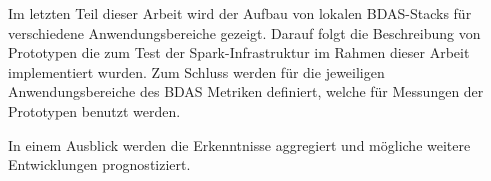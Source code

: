 Im letzten Teil dieser Arbeit wird der Aufbau von lokalen BDAS-Stacks für verschiedene Anwendungsbereiche gezeigt. Darauf folgt die Beschreibung von Prototypen die zum Test der Spark-Infrastruktur im Rahmen dieser Arbeit implementiert wurden. Zum Schluss werden für die jeweiligen Anwendungsbereiche des BDAS Metriken definiert, welche für Messungen der Prototypen benutzt werden. 

In einem Ausblick werden die Erkenntnisse aggregiert und mögliche weitere Entwicklungen prognostiziert.   


